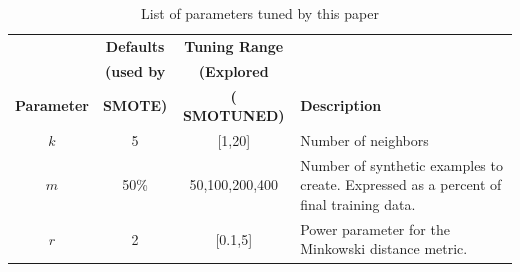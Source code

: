 \documentclass[10pt,conference]{IEEEtran}
\theoremstyle{break}
\theoremstyle{break}
\begin{document}



\begin{table}[!t]
    \begin{center}
\scriptsize
\begin{tabular}{c|c|c|p{3cm}} 
        \textbf{} & \textbf{Defaults} & \textbf{Tuning Range} & \\
          & \textbf{(used by  } & \textbf{(Explored  } &  \\  
        \textbf{Parameter} & \textbf{ SMOTE)} & \textbf{( SMOTUNED)} &  \textbf{Description} \\
          
          
        \hline
        $k$ & 5 & [1,20] & Number of neighbors \\ 
        \hline
       $m$ & 50\% & {50,100,200,400} & Number of synthetic examples to create. Expressed as a percent  of final training data. \\ 
        \hline
        $r$ & 2 & [0.1,5] & Power parameter for the Minkowski distance metric.\\
 
\end{tabular}
\end{center}
\caption{List of parameters tuned by this paper}
\label{tb:tuned}
\end{table}
\end{document}
